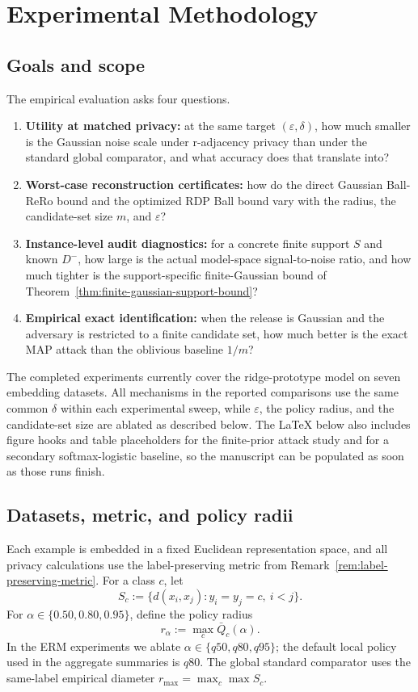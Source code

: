 \documentclass[conference,compsoc]{IEEEtran}
\begin{document}
\section{Experimental Methodology}
\label{sec:experiments}

\subsection{Goals and scope}
The empirical evaluation asks four questions.
\begin{enumerate}[leftmargin=1.5em]
    \item \textbf{Utility at matched privacy:} at the same target $(\varepsilon,\delta)$, how much smaller is the Gaussian noise scale under r-adjacency privacy than under the standard global comparator, and what accuracy does that translate into?
    \item \textbf{Worst-case reconstruction certificates:} how do the direct Gaussian Ball-ReRo bound and the optimized RDP Ball bound vary with the radius, the candidate-set size $m$, and $\varepsilon$?
    \item \textbf{Instance-level audit diagnostics:} for a concrete finite support $S$ and known $D^-$, how large is the actual model-space signal-to-noise ratio, and how much tighter is the support-specific finite-Gaussian bound of Theorem~\ref{thm:finite-gaussian-support-bound}?
    \item \textbf{Empirical exact identification:} when the release is Gaussian and the adversary is restricted to a finite candidate set, how much better is the exact MAP attack than the oblivious baseline $1/m$?
\end{enumerate}

The completed experiments currently cover the ridge-prototype model on seven embedding datasets. All mechanisms in the reported comparisons use the same common $\delta$ within each experimental sweep, while $\varepsilon$, the policy radius, and the candidate-set size are ablated as described below. The LaTeX below also includes figure hooks and table placeholders for the finite-prior attack study and for a secondary softmax-logistic baseline, so the manuscript can be populated as soon as those runs finish.

\subsection{Datasets, metric, and policy radii}
Each example is embedded in a fixed Euclidean representation space, and all privacy calculations use the label-preserving metric from Remark~\ref{rem:label-preserving-metric}. For a class $c$, let
\[
S_c:=\{d(x_i,x_j): y_i=y_j=c,\ i<j\}.
\]
For $\alpha\in\{0.50,0.80,0.95\}$, define the policy radius
\[
r_\alpha:=\max_c \bar Q_c(\alpha).
\]
In the ERM experiments we ablate $\alpha\in\{q50,q80,q95\}$; the default local policy used in the aggregate summaries is $q80$. The global standard comparator uses the same-label empirical diameter $r_{\max}=\max_c\max S_c$.
\end{document}
